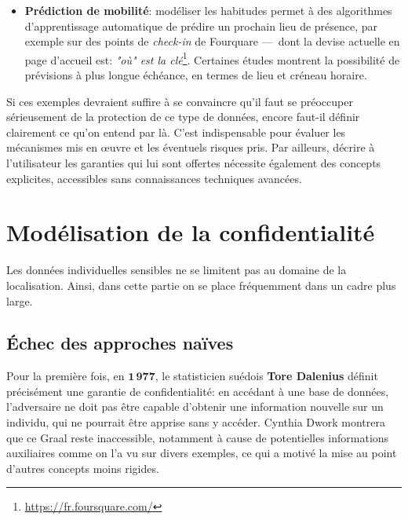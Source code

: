 \documentclass[a4paper,11pt]{article} %
\begin{document}
\begin{itemize}
    Ajoutons que le matériel utilisé et les paramètres logiciels suffisent généralement déjà à fabriquer un profil unique\footnote{Voir \url{https://amiunique.org/fp} en ce qui concerne la navigation sur le web.} et que les appareils connectés sont richement dotés en capteurs divers\footnote{\url{https://epu2017.sciencesconf.org/data/Delabre.pdf} le détaille en pages 5-6.}, potentiellement bavards. La combinaison de ces informations est donc redoutable.
    \item 
    \textbf{Prédiction de mobilité}: modéliser les habitudes permet à des algorithmes d'apprentissage automatique de prédire un prochain lieu de présence, par exemple sur des points de \emph{check-in} de Fourquare ---~dont la devise actuelle en page d'accueil est: \emph{\og "où" est la clé\fg{}}\footnote{\url{https://fr.foursquare.com/}}. 
    Certaines études montrent la possibilité de prévisions à plus longue échéance, en termes de lieu et créneau horaire. 
\end{itemize}
Si ces exemples devraient suffire à se convaincre qu'il faut se préoccuper sérieusement de la protection de ce type de données, encore faut-il définir clairement ce qu'on entend par là. 
C'est indispensable pour évaluer les mécanismes mis en œuvre et les éventuels risques pris. 
Par ailleurs, décrire à l'utilisateur les garanties qui lui sont offertes nécessite également des concepts explicites, accessibles sans connaissances techniques avancées.
\section{Modélisation de la confidentialité}
Les données individuelles sensibles ne se limitent pas au domaine de la localisation. Ainsi, dans cette partie on se place fréquemment dans un cadre plus large.
%
\subsection{Échec des approches naïves}
%
Pour la première fois, en $\mathbf{1\,977}$, le statisticien suédois \textbf{Tore Dalenius} définit précisément une garantie de confidentialité\cite{D77}: en accédant à une base de données, l'adversaire ne doit pas être capable d'obtenir une information nouvelle sur un individu, qui ne pourrait être apprise sans y accéder. 
Cynthia Dwork montrera que ce Graal reste inaccessible, notamment à cause de potentielles informations auxiliaires comme on l'a vu sur divers exemples, ce qui a motivé la mise au point d'autres concepts moins rigides.
\end{document}
